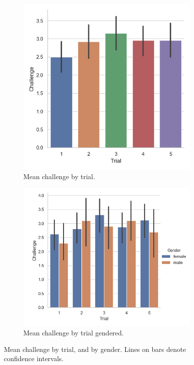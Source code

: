 \begin{figure}[H]
 \begin{subfigure}[b]{0.5\textwidth}
     \centering
     \includegraphics[scale=0.5]{Files/Plots/challenge_by_trial_mean.png}
     \caption{Mean challenge by trial.}
     \label{fig:meanChalTrial}
 \end{subfigure}
  \begin{subfigure}[b]{0.5\textwidth}
     \centering
     \includegraphics[scale=0.5]{Files/Plots/challenge_by_trial_median_gen.png}
     \caption{Mean challenge by trial gendered.}
     \label{fig:meanChalTrialGen}
 \end{subfigure}
     \caption{Mean challenge by trial, and by gender. Lines on bars denote confidence intervals.}
    \label{fig:chalByTrial}
\end{figure}

